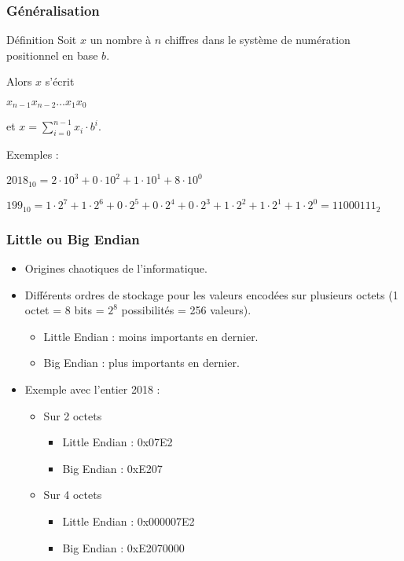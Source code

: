 	\frame
	{
		\frametitle{G\'en\'eralisation}
		\begin{block}{D\'efinition}
			Soit $x$ un nombre \`a $n$ chiffres dans le syst\`eme de num\'eration positionnel en base $b$.
			
			Alors $x$ s'\'ecrit
			
			$x_{n-1}x_{n-2}\ldots x_1x_0$
			
			et $x=\sum\limits_{i = 0}^{n-1}x_i\cdot b^i$.
		\end{block}
		
		Exemples :
		\begin{description}
			\item<2-> $2018_{10} = 2\cdot10^3 + 0\cdot10^2 + 1\cdot10^1+8\cdot10^0$
			\item<3-> $199_{10} = 1\cdot2^7 + 1\cdot2^6 + 0\cdot2^5+0\cdot2^4 + 0\cdot2^3 + 1\cdot2^2 + 1\cdot2^1+1\cdot2^0 = 11000111_2$
		\end{description}
	}

\frame
{
	\frametitle{Little ou Big Endian}
	\begin{itemize}
		\item<2-> Origines chaotiques de l'informatique.
		\item<3-> Diff\'erents ordres de stockage pour les valeurs encod\'ees sur plusieurs octets (1 octet = 8 bits = $2^8$ possibilit\'es = 256 valeurs).
		\begin{itemize}
			\item<4-> Little Endian : moins importants en dernier.
			\item<5-> Big Endian : plus importants en dernier.
		\end{itemize}
		\item<6-> Exemple avec l'entier 2018 :
		\begin{itemize}
			\item<7-> Sur 2 octets
			\begin{itemize}
				\item<8-> Little Endian : 0x07E2
				\item<9-> Big Endian : 0xE207
			\end{itemize}
			\item<10-> Sur 4 octets
			\begin{itemize}
				\item<11-> Little Endian : 0x000007E2
				\item<12-> Big Endian : 0xE2070000
			\end{itemize}
		\end{itemize}
	\end{itemize}
}

